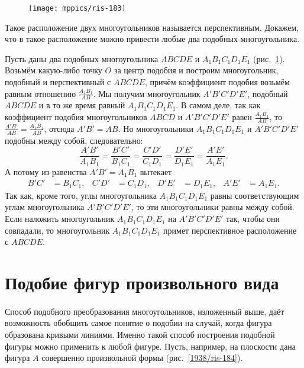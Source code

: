 \documentclass[oneside]{book}
\begin{document}
\begin{figure}[h]
\centering
\texttt{[image: mppics/ris-183]}
\caption{}\label{1938/ris-183}
\end{figure}

Такое расположение двух многоугольников называется перспективным. %
Докажем, что в такое расположение можно привести любые два подобных многоугольника.

Пусть даны два подобных многоугольника $ABCDE$ и $A_1B_1C_1D_1E_1$ (рис.~\ref{1938/ris-183}).
Возьмём какую-либо точку $O$ за центр подобия и построим многоугольник, подобный и перспективный с $ABCDE$, причём коэффициент подобия возьмём равным отношению $\frac{A_1B_1}{AB}$.
Мы получим многоугольник $A'B'C'D'E'$, подобный $ABCDE$ и в то же время равный $A_1B_1C_1D_1E_1$.
В самом деле, так как коэффициент подобия многоугольников $ABCD$ и $A'B'C'D'E'$ равен $\frac{A_1B_1}{AB}$, то $\frac{A'B'}{AB}=\frac{A_1B_1}{AB}$, отсюда $A'B'=AB$.
Но многоугольники $A_1B_1C_1D_1E_1$ и $A'B'C'D'E'$ подобны между собой, следовательно:
\[\frac{A'B'}{A_1B_1}=\frac{B'C'}{B_1C_1}=\frac{C'D'}{C_1D_1}=\frac{D'E'}{D_1E_1}=\frac{A'E'}{A_1E_1}.\]
А потому из равенства $A'B'=A_1B_1$ вытекает 
\begin{align*}
B'C'&=B_1C_1,&
C'D'&=C_1D_1,&
D'E'&=D_1E_1,&
A'E'&=A_1E_1.
\end{align*}
Так как, кроме того, углы многоугольника $A_1B_1C_1D_1E_1$ равны соответствующим углам многоугольника $A'B'C'D'E'$, то эти многоугольники равны между собой. %
Если наложить многоугольник $A_1B_1C_1D_1E_1$ на  $A'B'C'D'E'$ так, чтобы они совпадали, то многоугольник $A_1B_1C_1D_1E_1$ примет перспективное расположение с $ABCDE$. %

\section{Подобие фигур произвольного вида}

\paragraph{}\label{1938/177}
Способ подобного преобразования многоугольников, изложенный выше, даёт возможность обобщить самое понятие о подобии на случай, когда фигура образована кривыми линиями.
Именно такой способ построения подобной фигуры можно применить к любой фигуре.
Пусть, например, на плоскости дана фигура $A$ совершенно произвольной формы (рис.~\ref{1938/ris-184}).
\end{document}
